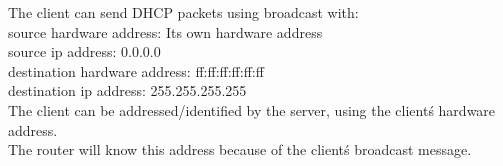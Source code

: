 The client can send DHCP packets using broadcast with: \\
source hardware address: Its own hardware address \\
source ip address: 0.0.0.0 \\

destination hardware address: ff:ff:ff:ff:ff:ff \\
destination ip address: 255.255.255.255 \\

The client can be addressed/identified by the server, using the client\'s hardware address. \\
The router will know this address because of the client\'s broadcast message. \\